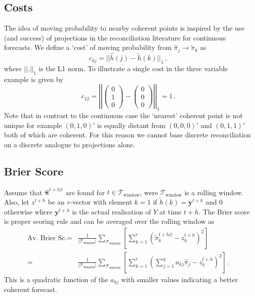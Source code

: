 \documentclass{article}
\newcommand{\bpi}{\bm{\pi}}
\begin{document}
    \subsection{Costs}
    
    The idea of moving probability to nearby coherent points is inspired by the use (and success) of projections in the reconciliation literature for continuous forecasts. We define a `cost' of moving probability from $\hat{\pi}_j\rightarrow\tilde{\pi}_k$ as
    \[
    c_{kj}=||\hat{h}(j)-\tilde{h}(k)||_1\,,
    \]
    where $||.||_1$ is the L1 norm. To illustrate a single cost in the three variable example is given by
    \[
    c_{12}=\left|\left|\begin{pmatrix}0\\1\\0\end{pmatrix}-\begin{pmatrix}0\\0\\0\end{pmatrix}\right|\right|_1=1\,.
    \]
    Note that in contrast to the continuous case the `nearest' coherent point is not unique for example $(0,1,0)'$ is equally distant from $(0,0,0)'$ and $(0,1,1)'$ both of which are coherent. For this reason we cannot base discrete reconciliation on a discrete analogue to projections alone.
    
    \subsection{Brier Score}
    
    Assume that $\hat{\bpi}^{t+h|t}$ are found for $t\in\mathcal{T}_{\textrm{window}}$, were $\mathcal{T}_{\textrm{window}}$ is a rolling window. Also, let $z^{t+h}$ be an $r$-vector with element $k=1$ if $\tilde{h}(k)=\bm{y}^{t+h}$ and $0$ otherwise where $\bm{y}^{t+h}$ is the actual realisation of $Y$ at time $t+h$. The Brier score is  proper scoring rule and can be averaged over the rolling window as
    \begin{align*}
    \textrm{Av. Brier Sc.}=&\frac{1}{|\mathcal{T}_{\textrm{window}}|}\sum\limits_{\mathcal{T}_{\textrm{window}}}\left[\sum\limits_{k=1}^r\left(\tilde{\pi}_k^{t+h|t}-z^{t+h}_k\right)^2\right]\\
    =&\frac{1}{|\mathcal{T}_{\textrm{window}}|}\sum\limits_{\mathcal{T}_{\textrm{window}}}\left[\sum\limits_{k=1}^r\left(\sum\limits_{j=1}^q a_{kj}\hat{{\pi}}_j-z^{t+h}_k\right)^2\right]\,.
    \end{align*}
    This is a quadratic function of the $a_{kj}$ with smaller values indicating a better coherent forecast.
    
\end{document}
